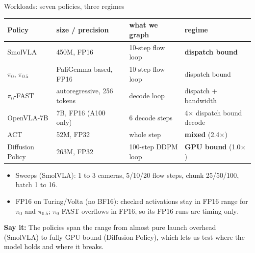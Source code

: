 \documentclass[aspectratio=169,10pt]{beamer}
\newcommand{\say}[1]{\par\vfill\noindent\colorbox{soft}{\parbox{\dimexpr\textwidth-2\fboxsep\relax}{\small\textbf{\textcolor{accent}{Say it:}} #1}}}
\begin{document}
\begin{frame}{Workloads: seven policies, three regimes}
\small
\begin{tabular}{llll}\toprule
Policy & size / precision & what we graph & regime\\\midrule
SmolVLA & 450M, FP16 & 10-step flow loop & \textbf{dispatch bound}\\
$\pi_0$, $\pi_{0.5}$ & PaliGemma-based, FP16 & 10-step flow loop & dispatch bound\\
$\pi_0$-FAST & autoregressive, 256 tokens & decode loop & dispatch + bandwidth\\
OpenVLA-7B & 7B, FP16 (A100 only) & 6 decode steps & 4$\times$ dispatch bound decode\\
ACT & 52M, FP32 & whole step & \textbf{mixed} (2.4$\times$)\\
Diffusion Policy & 263M, FP32 & 100-step DDPM loop & \textbf{GPU bound} (1.0$\times$)\\\bottomrule
\end{tabular}
\vspace{0.6em}
\begin{itemize}
\item Sweeps (SmolVLA): 1 to 3 cameras, 5/10/20 flow steps, chunk 25/50/100, batch 1 to 16.
\item FP16 on Turing/Volta (no BF16): checked activations stay in FP16 range for $\pi_0$ and
  $\pi_{0.5}$; $\pi_0$-FAST overflows in FP16, so its FP16 runs are timing only.
\end{itemize}
\say{The policies span the range from almost pure launch overhead (SmolVLA) to fully GPU bound
(Diffusion Policy), which lets us test where the model holds and where it breaks.}
\end{frame}
\end{document}
